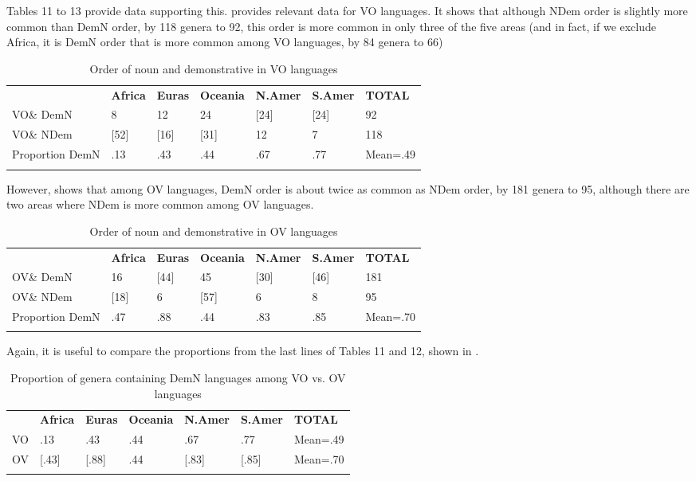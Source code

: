 \documentclass[output=paper]{langsci/langscibook}
\begin{document}
Tables 11 to 13 provide data supporting this.  provides relevant data for VO languages. It shows that although NDem order is slightly more common than DemN order, by 118 genera to 92, this order is more common in only three of the five areas (and in fact, if we exclude Africa, it is DemN order that is more common among VO languages, by 84 genera to 66)

\begin{table}
\begin{tabularx}{\textwidth}{XXXXXXX} 
& \bfseries Africa & \bfseries Euras & \bfseries Oceania & \bfseries N.Amer & \bfseries S.Amer & \bfseries TOTAL\\
\lsptoprule
VO\& DemN & 8 & 12 & 24 & [24] & [24] & 92\\
VO\& NDem & [52] & [16] & [31] & 12 & 7 & 118\\
Proportion DemN & .13 & .43 & .44 & .67 & .77 & Mean=.49\\
\lspbottomrule
\end{tabularx}
\caption{\label{tab:dryer:11}Order of noun and demonstrative in VO languages}
\end{table}


However,  shows that among OV languages, DemN order is about twice as common as NDem order, by 181 genera to 95, although there are two areas where NDem is more common among OV languages.

\begin{table}
\begin{tabularx}{\textwidth}{XXXXXXX}
\lsptoprule
& \bfseries Africa & \bfseries Euras & \bfseries Oceania & \bfseries N.Amer & \bfseries S.Amer & \bfseries TOTAL\\
OV\& DemN & 16 & [44] & 45 & [30] & [46] & 181\\
OV\& NDem & [18] & 6 & [57] & 6 & 8 & 95\\
Proportion DemN & .47 & .88 & .44 & .83 & .85 & Mean=.70\\
\lspbottomrule
\end{tabularx}
\caption{\label{tab:dryer:12}Order of noun and demonstrative in OV languages}
\end{table}

Again, it is useful to compare the proportions from the last lines of Tables 11 and 12, shown in .

\begin{table}
\begin{tabularx}{\textwidth}{XXXXXXX}
\lsptoprule
& \bfseries Africa & \bfseries Euras & \bfseries Oceania & \bfseries N.Amer & \bfseries S.Amer & \bfseries TOTAL\\
VO & .13 & .43 & .44 & .67 & .77 & Mean=.49\\
OV & [.43] & [.88] & .44 & [.83] & [.85] & Mean=.70\\
\lspbottomrule
\end{tabularx}
\caption{\label{tab:dryer:13}Proportion of genera containing DemN languages among VO vs. OV languages}
\end{table}
\end{document}
